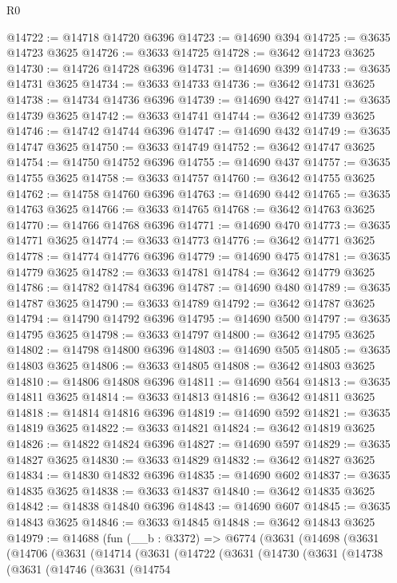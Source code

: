 \begin{lexlean}{R0}
\begin{coremodule}
@14722 := @14718 @14720 @6396
@14723 := @14690 @394
@14725 := @3635 @14723 @3625
@14726 := @3633 @14725
@14728 := @3642 @14723 @3625
@14730 := @14726 @14728 @6396
@14731 := @14690 @399
@14733 := @3635 @14731 @3625
@14734 := @3633 @14733
@14736 := @3642 @14731 @3625
@14738 := @14734 @14736 @6396
@14739 := @14690 @427
@14741 := @3635 @14739 @3625
@14742 := @3633 @14741
@14744 := @3642 @14739 @3625
@14746 := @14742 @14744 @6396
@14747 := @14690 @432
@14749 := @3635 @14747 @3625
@14750 := @3633 @14749
@14752 := @3642 @14747 @3625
@14754 := @14750 @14752 @6396
@14755 := @14690 @437
@14757 := @3635 @14755 @3625
@14758 := @3633 @14757
@14760 := @3642 @14755 @3625
@14762 := @14758 @14760 @6396
@14763 := @14690 @442
@14765 := @3635 @14763 @3625
@14766 := @3633 @14765
@14768 := @3642 @14763 @3625
@14770 := @14766 @14768 @6396
@14771 := @14690 @470
@14773 := @3635 @14771 @3625
@14774 := @3633 @14773
@14776 := @3642 @14771 @3625
@14778 := @14774 @14776 @6396
@14779 := @14690 @475
@14781 := @3635 @14779 @3625
@14782 := @3633 @14781
@14784 := @3642 @14779 @3625
@14786 := @14782 @14784 @6396
@14787 := @14690 @480
@14789 := @3635 @14787 @3625
@14790 := @3633 @14789
@14792 := @3642 @14787 @3625
@14794 := @14790 @14792 @6396
@14795 := @14690 @500
@14797 := @3635 @14795 @3625
@14798 := @3633 @14797
@14800 := @3642 @14795 @3625
@14802 := @14798 @14800 @6396
@14803 := @14690 @505
@14805 := @3635 @14803 @3625
@14806 := @3633 @14805
@14808 := @3642 @14803 @3625
@14810 := @14806 @14808 @6396
@14811 := @14690 @564
@14813 := @3635 @14811 @3625
@14814 := @3633 @14813
@14816 := @3642 @14811 @3625
@14818 := @14814 @14816 @6396
@14819 := @14690 @592
@14821 := @3635 @14819 @3625
@14822 := @3633 @14821
@14824 := @3642 @14819 @3625
@14826 := @14822 @14824 @6396
@14827 := @14690 @597
@14829 := @3635 @14827 @3625
@14830 := @3633 @14829
@14832 := @3642 @14827 @3625
@14834 := @14830 @14832 @6396
@14835 := @14690 @602
@14837 := @3635 @14835 @3625
@14838 := @3633 @14837
@14840 := @3642 @14835 @3625
@14842 := @14838 @14840 @6396
@14843 := @14690 @607
@14845 := @3635 @14843 @3625
@14846 := @3633 @14845
@14848 := @3642 @14843 @3625
@14979 := @14688
    (fun (__b : @3372) =>
    @6774
      (@3631
        (@14698
          (@3631
            (@14706
              (@3631
                (@14714
                  (@3631
                    (@14722
                      (@3631
                        (@14730
                          (@3631
                            (@14738
                              (@3631
                                (@14746
                                  (@3631
                                    (@14754

\end{coremodule}
\end{lexlean}
